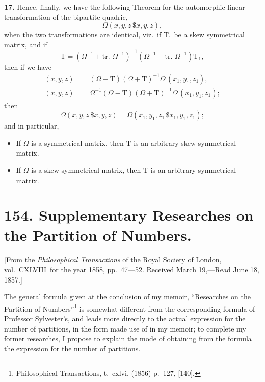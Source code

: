 \documentclass[11pt,a4paper]{book}
\begin{document}
\begin{center}
\medskip
\noindent\textbf{17.} Hence, finally, we have the following Theorem for the automorphic linear transformation of the bipartite quadric,
\[
\Omega(x,y,z\,\$x,y,z),
\]
when the two transformations are identical, viz.\ if $\mathrm{T}_1$ be a skew symmetrical matrix, and if
\[
\mathrm{T} = (\Omega^{-1} + \text{tr. }\Omega^{-1})^{-1}(\Omega^{-1} - \text{tr. }\Omega^{-1})\mathrm{T}_1,
\]
then if we have
\begin{align*}
(x,y,z) &= (\Omega - \mathrm{T})(\Omega + \mathrm{T})^{-1}\Omega\,(x_1,y_1,z_1), \\
(x,y,z) &= \Omega^{-1}(\Omega - \mathrm{T})(\Omega + \mathrm{T})^{-1}\Omega\,(x_1,y_1,z_1);
\end{align*}
then
\[\Omega(x,y,z\,\$x,y,z) = \Omega(x_1,y_1,z_1\,\$x_1,y_1,z_1);\]
and in particular,
\begin{itemize}[leftmargin=2em]
\item If $\Omega$ is a symmetrical matrix, then $\mathrm{T}$ is an arbitrary skew symmetrical matrix.
\item If $\Omega$ is a skew symmetrical matrix, then $\mathrm{T}$ is an arbitrary symmetrical matrix.
\end{itemize}

\newpage

\section*{154. Supplementary Researches on the Partition of Numbers.}

[From the \textit{Philosophical Transactions} of the Royal Society of London, vol.~CXLVIII\ for the year 1858, pp.~47---52.
Received March 19,---Read June 18, 1857.]

\bigskip

The general formula given at the conclusion of my memoir, ``Researches on the Partition of Numbers''\footnote{Philosophical Transactions, t.~cxlvi. (1856) p.~127, [140].} is somewhat different from the corresponding formula of Professor Sylvester's, and leads more directly to the actual expression for the number of partitions, in the form made use of in my memoir; to complete my former researches, I propose to explain the mode of obtaining from the formula the expression for the number of partitions.


\end{center}
\end{document}
